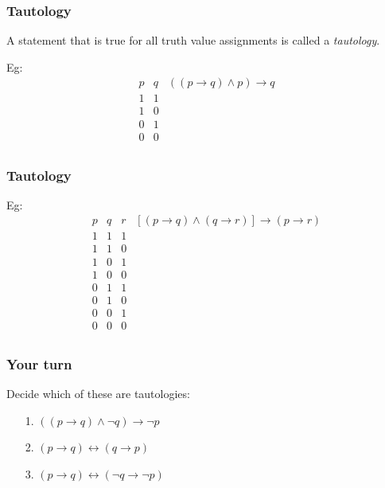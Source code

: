 \documentclass[10pt]{beamer}
\newcommand{\ra}{\to} %
\theoremstyle{definition}
\begin{document}
\begin{frame}
\frametitle{Tautology}



A statement that is true for all truth value assignments is called a {\em tautology}. 

\pause \bigskip

Eg:    
 \[\begin{array}{c|c|ccc}
 p & q & ((p\ra q)\wedge p) \ra q\\
 \hline
    1 & 1 &   \\
   1 & 0 &   \\
   0& 1  &   \\
   0 & 0 &   \\
\end{array}\]

\vspace{2cm}
\vfill
\end{frame}





\begin{frame}
\frametitle{Tautology}




Eg:    
 \[\begin{array}{c|c|c|cc}
 p & q & r& \left[(p\ra q)\wedge (q\ra r)\right] \ra (p\ra r)\\
 \hline
  1 &  1 & 1 &   \\
   1 &1 & 0 &   \\
   1 &0& 1  &   \\
  1 & 0 & 0 &   \\
 0&  1 & 1 &   \\
 0& 1 & 0 &   \\
  0&0& 1  &   \\
  0&0 & 0 &   \\
\end{array}\]

\vspace{2cm}
\vfill
\end{frame}



\begin{frame}
\frametitle{Your turn}

Decide which of these are tautologies:

\begin{enumerate}

\item[1.] $((p\ra q)\wedge \neg q) \ra \neg p$
\item[2.] $(p\ra q)\leftrightarrow ( q\ra p)$
\item[3.] $(p\ra q)\leftrightarrow (\neg q\ra \neg p)$
\end{enumerate}
\vspace{4cm}
\vfill
\end{frame}
\end{document}
